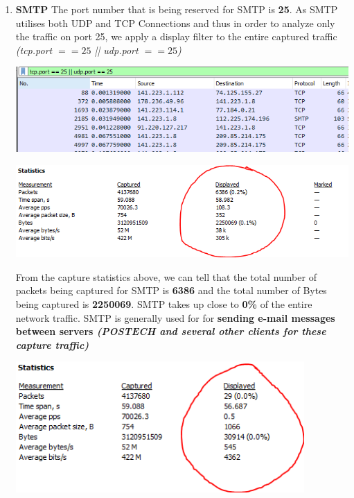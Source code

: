 \documentclass[a4paper,11pt]{article}
\begin{document}
\begin{enumerate}
	\item \textbf{SMTP}
	\newline
	The port number that is being reserved for SMTP is \textbf{25}. As SMTP utilises both UDP and TCP Connections and thus in order to analyze only the traffic on port 25, we apply a display filter to the entire captured traffic \textit{(tcp.port $== 25$ || udp.port $== 25$)}\newline
	\begin{minipage}{3in}
	\centering
		\includegraphics[width = 16cm]{smtpfilter}
		\captionsetup{justification=centering}
	\end{minipage}
	\newline\newline
	\begin{minipage}{5in}
	\centering
		\includegraphics[width = 16cm]{smtpcapturestats}
		\captionsetup{justification=centering}
	\end{minipage}
	\newline\newline
	From the capture statistics above, we can tell that the total number of packets being captured for SMTP is \textbf{6386} and the total number of Bytes being captured is \textbf{2250069}. SMTP takes up close to \textbf{0\%} of the entire network traffic. SMTP is generally used for for \textbf{sending e-mail messages between servers \textit{(POSTECH and several other clients for these capture traffic)}} \newline\newline
\begin{minipage}{5in}
	\centering
		\includegraphics[width = 11cm]{udpsmtp}

\end{minipage}
\end{enumerate}
\end{document}
